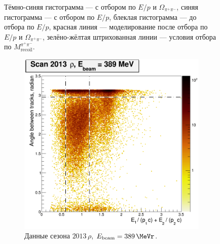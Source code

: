 \begin{figure}
\begin{minipage}[t]{0.45\textwidth}
        \caption{Тёмно-синяя гистограмма --- с отбором по $E/p$ и $\Omega_{\pi^+ \pi^-}$,
            синяя гистограмма --- с отбором по $E/p$,
            блеклая гистограмма --- до отбора по $E/p$,
            красная линия --- моделирование после отбора по $E/p$ и $\Omega_{\pi^+ \pi^-}$,
            зелёно-жёлтая штрихованная линии --- условия отбора по $M_{\text{recoil}}^{\pi^+ \pi^-}$.}\label{fig:3pi_mpipi}
  \end{minipage}
\end{figure}


\begin{figure}[htbp]
    \centering
    \begin{subfigure}[b]{0.45\textwidth}
        \includegraphics[width=\textwidth]{img/raskl_vs_sumEP_rho389.png}
        \caption{Данные сезона $2013 \, \rho$, $E_{\text{beam}} = \SI{389}{\MeVr}$.}\label{fig:3pi_raskl_rho389}
    \end{subfigure}
    ~
    \begin{subfigure}[b]{0.45\textwidth}

\end{subfigure}
\end{figure}
